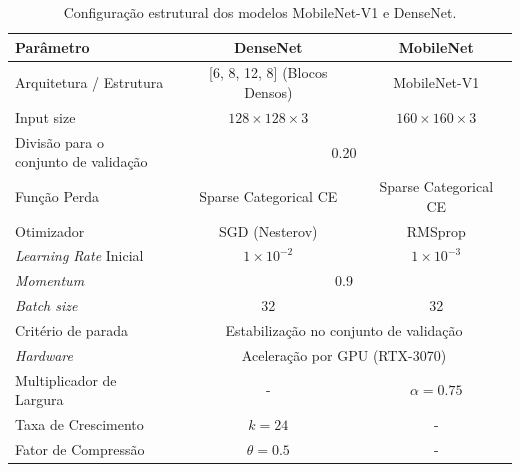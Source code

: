 \begin{table}[h]
	\centering
	\caption{Configuração estrutural dos modelos MobileNet-V1 e DenseNet.}
	\label{tab:unified_training_config}
	\renewcommand{\arraystretch}{1.3}
	
	\begin{tabular}{l | c | c}
		
		\toprule
		\textbf{Parâmetro} & \textbf{DenseNet} & \textbf{MobileNet}\\
		\midrule
		
		Arquitetura / Estrutura 
		& [6, 8, 12, 8] (Blocos Densos) 
		& MobileNet-V1\\
		
		Input size 
		& $128 \times 128 \times 3$ 
		& $160 \times 160 \times 3$\\
		
		\hline
		\makecell[l]{Divisão para o\\conjunto de validação}
		& \multicolumn{2}{c}{0.20} \\
		
		\hline
		
		Função Perda
		& Sparse Categorical CE 
		& Sparse Categorical CE\\
		
		Otimizador 
		& SGD (Nesterov) 
		& RMSprop\\
		
		\textit{Learning Rate} Inicial 
		& $1 \times 10^{-2}$ 
		& $1 \times 10^{-3}$\\
		
		\hline
		
		\textit{Momentum} 
		& \multicolumn{2}{c}{0.9} \\
		
		\hline
		
		\textit{Batch size }
		& 32 
		& 32\\
		
		\hline
		
		Critério de parada
		& \multicolumn{2}{c}{Estabilização no conjunto de validação}\\
		
		\hline
		
		\textit{Hardware} 
		& \multicolumn{2}{c}{Aceleração por GPU  (RTX-3070)}\\
		
		\hline
		
		Multiplicador de Largura
		& - 
		& $\alpha = 0.75$\\
		
		Taxa de Crescimento
		& $k = 24$
		& -\\
		
		Fator de Compressão
		& $\theta = 0.5$ 
		& -\\
		
		\bottomrule
	\end{tabular}
\end{table}

